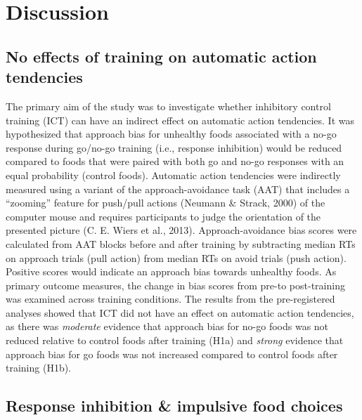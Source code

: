 \documentclass[man,floatsintext]{apa6}
\begin{document}
\hypertarget{discussion}{%
\section{Discussion}\label{discussion}}

\hypertarget{no-effects-of-training-on-automatic-action-tendencies}{%
\subsection{No effects of training on automatic action tendencies}\label{no-effects-of-training-on-automatic-action-tendencies}}

\par

The primary aim of the study was to investigate whether inhibitory control training (ICT) can have an indirect effect on automatic action tendencies. It was hypothesized that approach bias for unhealthy foods associated with a no-go response during go/no-go training (i.e., response inhibition) would be reduced compared to foods that were paired with both go and no-go responses with an equal probability (control foods). Automatic action tendencies were indirectly measured using a variant of the approach-avoidance task (AAT) that includes a \enquote{zooming} feature for push/pull actions (Neumann \& Strack, 2000) of the computer mouse and requires participants to judge the orientation of the presented picture (C. E. Wiers et al., 2013). Approach-avoidance bias scores were calculated from AAT blocks before and after training by subtracting median RTs on approach trials (pull action) from median RTs on avoid trials (push action). Positive scores would indicate an approach bias towards unhealthy foods. As primary outcome measures, the change in bias scores from pre-to post-training was examined across training conditions. The results from the pre-registered analyses showed that ICT did not have an effect on automatic action tendencies, as there was \emph{moderate} evidence that approach bias for no-go foods was not reduced relative to control foods after training (H1a) and \emph{strong} evidence that approach bias for go foods was not increased compared to control foods after training (H1b).

\hypertarget{response-inhibition-impulsive-food-choices}{%
\subsection{Response inhibition \& impulsive food choices}\label{response-inhibition-impulsive-food-choices}}
\end{document}
